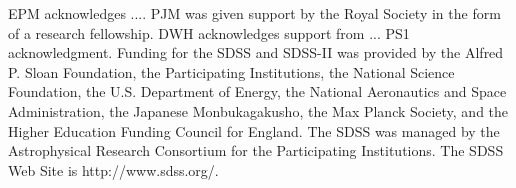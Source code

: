 EPM acknowledges ....
%
%
PJM was given support by the Royal 
Society in the form of a research fellowship.
%
DWH acknowledges support from ...
% 
PS1 acknowledgment.
%
Funding for the SDSS and SDSS-II was provided by the Alfred P. Sloan
Foundation, the Participating Institutions, the National Science
Foundation, the U.S. Department of Energy, the National Aeronautics
and Space Administration, the Japanese Monbukagakusho, the Max Planck
Society, and the Higher Education Funding Council for England. The
SDSS was managed by the Astrophysical Research Consortium for the
Participating Institutions. The SDSS Web Site is http://www.sdss.org/.

